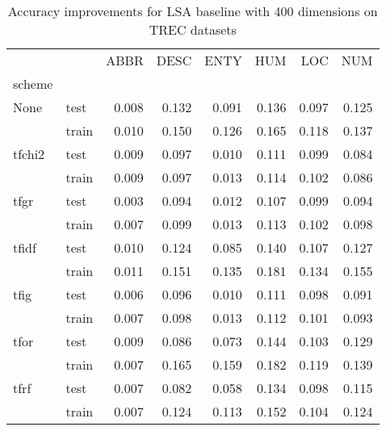 \begin{table}[h]
\begin{center}

\begin{tabular}{llrrrrrr}
\toprule
{} &  &  ABBR &  DESC &  ENTY &  HUM &  LOC &  NUM \\
scheme &  &       &       &       &      &      &      \\
\midrule
None & test &     0.008 &     0.132 &     0.091 &    0.136 &    0.097 &    0.125 \\
{} & train &     0.010 &     0.150 &     0.126 &    0.165 &    0.118 &    0.137 \\
tfchi2 & test &     0.009 &     0.097 &     0.010 &    0.111 &    0.099 &    0.084 \\
{} & train &     0.009 &     0.097 &     0.013 &    0.114 &    0.102 &    0.086 \\
tfgr & test &     0.003 &     0.094 &     0.012 &    0.107 &    0.099 &    0.094 \\
{} & train &     0.007 &     0.099 &     0.013 &    0.113 &    0.102 &    0.098 \\
tfidf & test &     0.010 &     0.124 &     0.085 &    0.140 &    0.107 &    0.127 \\
{} & train &     0.011 &     0.151 &     0.135 &    0.181 &    0.134 &    0.155 \\
tfig & test &     0.006 &     0.096 &     0.010 &    0.111 &    0.098 &    0.091 \\
{} & train &     0.007 &     0.098 &     0.013 &    0.112 &    0.101 &    0.093 \\
tfor & test &     0.009 &     0.086 &     0.073 &    0.144 &    0.103 &    0.129 \\
{} & train &     0.007 &     0.165 &     0.159 &    0.182 &    0.119 &    0.139 \\
tfrf & test &     0.007 &     0.082 &     0.058 &    0.134 &    0.098 &    0.115 \\
{} & train &     0.007 &     0.124 &     0.113 &    0.152 &    0.104 &    0.124 \\
\bottomrule
\end{tabular}

\caption[Accuracy improvements for LSA baseline with 400 dimensions on TREC datasets]{Accuracy improvements for LSA baseline with 400 dimensions on TREC datasets}
\label{tab:lsa:resuts:400:TREC}
\end{center}
\end{table}





